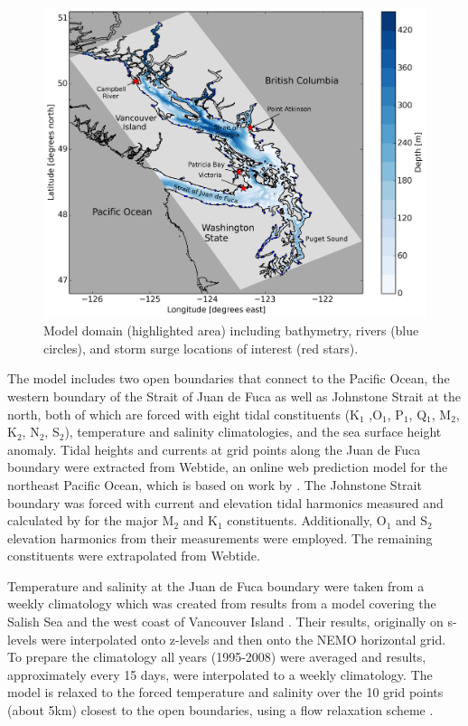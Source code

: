 \documentclass[pdftex,10pt]{article}
\begin{document}
\begin{figure}[h]
\centering
\includegraphics[scale=0.5]{Figures/bathy.pdf}
\caption{Model domain (highlighted area) including bathymetry, rivers (blue circles), and storm surge locations of interest  (red stars).}\label{fig:domain}
\end{figure}

The model includes two open boundaries that connect to the Pacific Ocean, the western boundary of the Strait of Juan de Fuca as well as Johnstone Strait at the north, both of which are forced with eight tidal constituents (K$_1$ ,O$_1$, P$_1$, Q$_1$, M$_2$, K$_2$, N$_2$, S$_2$), temperature and salinity climatologies, and the sea surface height anomaly. Tidal heights and currents at grid points along the Juan de Fuca boundary were extracted from Webtide, an online web prediction model for the northeast Pacific Ocean, which is based on work by \citet{foreman2000webtide}. The Johnstone Strait boundary was forced with current and elevation tidal harmonics measured and calculated by \citet{thomson1980johnstone} for the major M$_2$ and K$_1$ constituents. Additionally, O$_1$ and S$_2$ elevation harmonics from their measurements were employed. The remaining constituents were extrapolated from Webtide. 

Temperature and salinity at the Juan de Fuca boundary were taken from a weekly climatology which was created from results from a model covering the Salish Sea and the west coast of Vancouver Island \citep{massonfine2012}.  Their results, originally on s-levels were interpolated onto z-levels and then onto the NEMO horizontal grid.  To prepare the climatology all years (1995-2008) were averaged and results, approximately every 15 days, were interpolated to a weekly climatology. The model is relaxed to the forced temperature and salinity over the 10 grid points (about 5km) closest to the open boundaries, using a flow relaxation scheme \citep{engedahl1995use}. %
\end{document}
